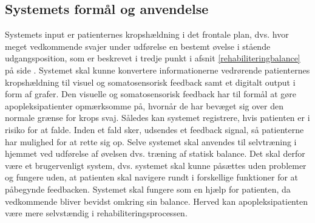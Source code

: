 \subsection{Systemets formål og anvendelse}\label{formaal_anvendelse}
Systemets input er patienternes kropshældning i det frontale plan, dvs. hvor meget vedkommende svajer under udførelse en bestemt øvelse i stående udgangsposition, som er beskrevet i tredje punkt i afsnit \ref{rehabiliteringbalance} på side \pageref{rehabiliteringbalance}. Systemet skal kunne konvertere informationerne vedrørende patienternes kropshældning til visuel og somatosensorisk feedback samt et digitalt output i form af grafer. Den visuelle og somatosensorisk feedback har til formål at gøre apopleksipatienter opmærksomme på, hvornår de har bevæget sig over den normale grænse for krops svaj. Således kan systemet registrere, hvis patienten er i risiko for at falde. Inden et fald sker, udsendes et feedback signal, så patienterne har mulighed for at rette sig op. Selve systemet skal anvendes til selvtræning i hjemmet ved udførelse af øvelsen dvs. træning af statisk balance. Det skal derfor være et brugervenligt system, dvs. systemet skal kunne påsættes uden problemer og fungere uden, at patienten skal navigere rundt i forskellige funktioner for at påbegynde feedbacken. Systemet skal fungere som en hjælp for patienten, da vedkommende bliver bevidst omkring sin balance. Herved kan apopleksipatienten være mere selvstændig i rehabiliteringsprocessen.
